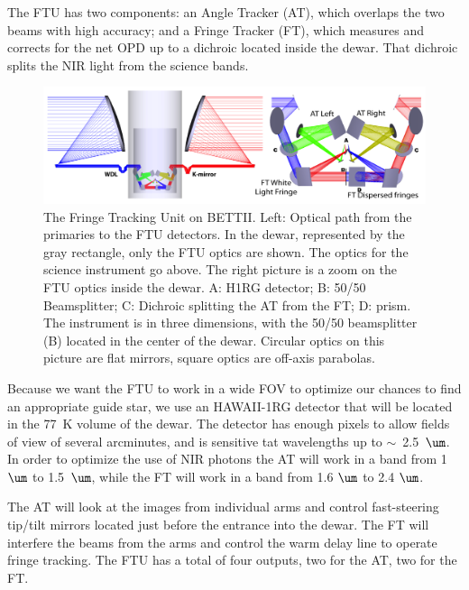 The FTU has two components: an Angle Tracker (AT), which overlaps the two beams with high accuracy; and a Fringe Tracker (FT), which measures and corrects for the net OPD up to a dichroic located inside the dewar. That dichroic splits the NIR light from the science bands. 
\begin{figure}[ht!]
\begin{center}
\includegraphics[width=1\textwidth]{Figures/Dewar_FT2.png}
\caption{The Fringe Tracking Unit on BETTII. Left: Optical path from the primaries to the FTU detectors. In the dewar, represented by the gray rectangle, only the FTU optics are shown. The optics for the science instrument go above. The right picture is a zoom on the FTU optics inside the dewar. A: H1RG detector; B: 50/50 Beamsplitter; C: Dichroic splitting the AT from the FT; D: prism. The instrument is in three dimensions, with the 50/50 beamsplitter (B) located in the center of the dewar. Circular optics on this picture are flat mirrors, square optics are off-axis parabolas.}
\label{fig:FTU}
\end{center}
\end{figure}

Because we want the FTU to work in a wide FOV to optimize our chances to find an appropriate guide star, we use an HAWAII-1RG detector that will be located in the 77~K volume of the dewar. The detector has enough pixels to allow fields of view of several arcminutes, and is sensitive tat wavelengths up to $\sim$~2.5~$\um$. In order to optimize the use of NIR photons the AT will work in a band from 1~$\um$ to 1.5~$\um$, while the FT will work in a band from 1.6 $\um$ to 2.4 $\um$.




The AT will look at the images from individual arms and control fast-steering tip/tilt mirrors located just before the entrance into the dewar. The FT will interfere the beams from the arms and control the warm delay line to operate fringe tracking. The FTU has a total of four outputs, two for the AT, two for the FT.


